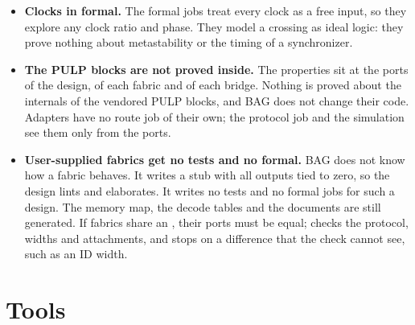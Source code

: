 \begin{itemize}
  job checks the address, the direction, the secure bit and the slave port. It does not
  check the other request fields (length, size, burst type, cache and protection bits),
  the write data, or the payload and routing of responses. On a fabric with several
  masters and no IDs (an AXI4-Lite crossbar or shared bus, or the AHB-Lite bus), the job does
  not explore two masters with open requests to the same address at the same time. The
  window check of a bridge uses single-beat accesses, one at a time.
\item \textbf{Clocks in formal.} The formal jobs treat every clock as a free input, so
  they explore any clock ratio and phase. They model a crossing as ideal logic: they prove
  nothing about metastability or the timing of a synchronizer.
\item \textbf{The PULP blocks are not proved inside.} The properties sit at the ports of
  the design, of each fabric and of each bridge. Nothing is proved about the internals of
  the vendored PULP blocks, and BAG does not change their code. Adapters have no route job
  of their own; the protocol job and the simulation see them only from the ports.
\item \textbf{User-supplied fabrics get no tests and no formal.} BAG does not know how a
   fabric behaves. It writes a stub with all outputs tied to zero, so
  the design lints and elaborates. It writes no tests and no formal jobs for such a
  design. The memory map, the decode tables and the documents are still generated. If
  fabrics share an , their ports must be equal;
   checks the protocol, widths and attachments, and
   stops on a difference that the check cannot see, such as an ID width.
\end{itemize}

\section{Tools}

